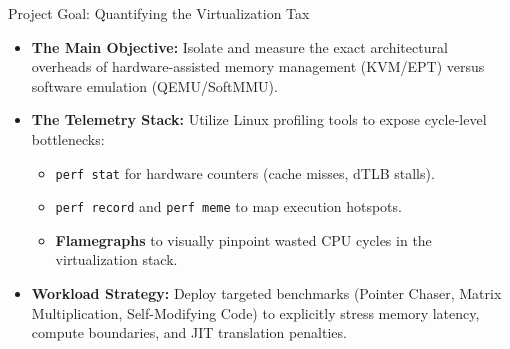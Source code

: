 \documentclass[aspectratio=169]{beamer} %
\begin{document}
\begin{frame}{Project Goal: Quantifying the Virtualization Tax}
      \begin{itemize}
          \item \textbf{The Main Objective:} Isolate and measure the exact architectural overheads of hardware-assisted memory management (KVM/EPT) versus software emulation (QEMU/SoftMMU).
          
          \vspace{0.4cm}
          \item \textbf{The Telemetry Stack:} Utilize Linux profiling tools to expose cycle-level bottlenecks:
          \begin{itemize}
              \item \texttt{perf stat} for hardware counters (cache misses, dTLB stalls).
              \item \texttt{perf record} and \texttt{perf meme} to map execution hotspots.
              \item \textbf{Flamegraphs} to visually pinpoint wasted CPU cycles in the virtualization stack.
          \end{itemize}
          
          \vspace{0.4cm}
          \item \textbf{Workload Strategy:} Deploy targeted benchmarks (Pointer Chaser, Matrix Multiplication, Self-Modifying Code) to explicitly stress memory latency, compute boundaries, and JIT translation penalties.
      \end{itemize}
\end{frame}
\end{document}
